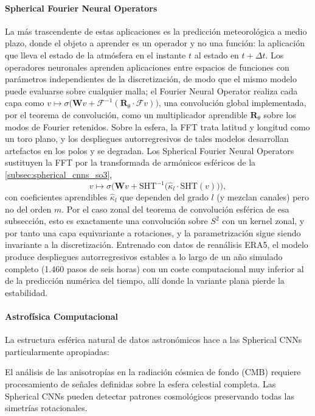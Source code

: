 \paragraph{Spherical Fourier Neural Operators}

La más trascendente de estas aplicaciones es la predicción meteorológica a medio plazo, donde el objeto a aprender es un operador y no una función: la aplicación que lleva el estado de la atmósfera en el instante $t$ al estado en $t + \Delta t$. Los operadores neuronales \citep{kovachki2023neural} aprenden aplicaciones entre espacios de funciones con parámetros independientes de la discretización, de modo que el mismo modelo puede evaluarse sobre cualquier malla; el Fourier Neural Operator realiza cada capa como $v \mapsto \sigma\big(\mathbf{W} v + \mathcal{F}^{-1}(\mathbf{R}_\theta \cdot \mathcal{F} v)\big)$, una convolución global implementada, por el teorema de convolución, como un multiplicador aprendible $\mathbf{R}_\theta$ sobre los modos de Fourier retenidos. Sobre la esfera, la \gls{FFT} trata latitud y longitud como un toro plano, y los despliegues autorregresivos de tales modelos desarrollan artefactos en los polos y se degradan. Los Spherical Fourier Neural Operators \citep{bonev2023sfno} sustituyen la \gls{FFT} por la transformada de armónicos esféricos de la \autoref{subsec:spherical_cnns_so3},
\[v \mapsto \sigma\Big(\mathbf{W} v + \text{SHT}^{-1}\big(\hat{\kappa}_l \cdot \text{SHT}(v)\big)\Big),\]
con coeficientes aprendibles $\hat{\kappa}_l$ que dependen del grado $l$ (y mezclan canales) pero no del orden $m$. Por el caso zonal del teorema de convolución esférica de esa subsección, esto es exactamente una convolución sobre $S^2$ con un kernel zonal, y por tanto una capa equivariante a rotaciones, y la parametrización sigue siendo invariante a la discretización. Entrenado con datos de reanálisis ERA5, el modelo produce despliegues autorregresivos estables a lo largo de un año simulado completo (1.460 pasos de seis horas) con un coste computacional muy inferior al de la predicción numérica del tiempo, allí donde la variante plana pierde la estabilidad.

\paragraph{Astrofísica Computacional}

La estructura esférica natural de datos astronómicos hace a las Spherical CNNs particularmente apropiadas:

\begin{example}
El análisis de las anisotropías en la radiación cósmica de fondo (CMB) requiere procesamiento de señales definidas sobre la esfera celestial completa. Las Spherical CNNs pueden detectar patrones cosmológicos preservando todas las simetrías rotacionales.
\end{example}

